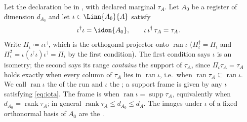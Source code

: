 \begin{definition}\label{def:support-frame}
Let the declaration be in , with declared marginal
$\tau_A$. Let $A_0$ be a register of dimension $d_{A_0}$ and let
$\iota\in\Linn{A_0}{A}$ satisfy
\begin{equation}\label{eq:iota}
  \iota^{\dagger}\iota=\idon{A_0},
  \qquad
  \iota\,\iota^{\dagger}\,\tau_A=\tau_A .
\end{equation}
Write $\Pi_{\iota}\coloneqq\iota\iota^{\dagger}$, which is the orthogonal
projector onto $\operatorname{ran}\iota$
($\Pi_{\iota}^{\dagger}=\Pi_{\iota}$ and
$\Pi_{\iota}^{2}=\iota(\iota^{\dagger}\iota)\iota^{\dagger}=\Pi_{\iota}$
by the first condition). The first condition says $\iota$ is an isometry;
the second says its range \emph{contains} the support of $\tau_A$, since
$\Pi_{\iota}\tau_A=\tau_A$ holds exactly when every column of $\tau_A$
lies in $\operatorname{ran}\iota$, i.e.\ when
$\operatorname{ran}\tau_A\subseteq\operatorname{ran}\iota$. We call
$\operatorname{ran}\iota$ the
of the run and $\iota$ the
;
a support frame is given by any $\iota$ satisfying \eqref{eq:iota}. The
frame is
when $\operatorname{ran}\iota=\operatorname{supp}\tau_A$, equivalently when
$d_{A_0}=\operatorname{rank}\tau_A$; in general
$\operatorname{rank}\tau_A\le d_{A_0}\le d_A$. The images under $\iota$
of a fixed orthonormal basis of $A_0$ are the
.


\end{definition}
